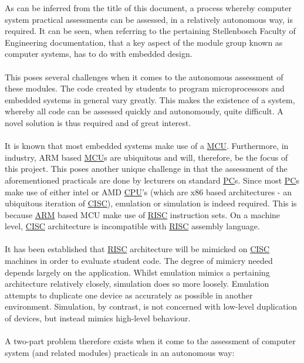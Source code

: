 As can be inferred from the title of this document, a process whereby computer system practical assessments can be assessed, in a relatively autonomous way, is required. It can be seen, when referring to the pertaining Stellenbosch Faculty of Engineering documentation, that a key aspect of the module group known as computer systems, has to do with embedded design. \cite{Stelle2020}
\\\\
This poses several challenges when it comes to the autonomous assessment of these modules. The code created by students to program microprocessors and embedded systems in general vary greatly. This makes the existence of a system, whereby all code can be assessed quickly and autonomously, quite difficult. A novel solution is thus required and of great interest.
\\\\
It is known that most embedded systems make use of a \hyperref[listAbr]{MCU}. Furthermore, in industry, ARM based \hyperref[listAbr]{MCU}s are ubiquitous and will, therefore, be the focus of this project. This poses another unique challenge in that the assessment of the aforementioned practicals are done by lecturers on standard \hyperref[listAbr]{PC}s. Since most \hyperref[listAbr]{PC}s make use of either intel\textsuperscript{{\tiny{\textregistered}}} or AMD\textsuperscript{{\tiny{\textregistered}}} \hyperref[listAbr]{CPU}'s (which are x86 based architectures - an ubiquitous iteration of \hyperref[listAbr]{CISC}), emulation or simulation is indeed required. This is because \hyperref[listAbr]{ARM} based MCU make use of \hyperref[listAbr]{RISC} instruction sets. On a machine level, \hyperref[listAbr]{CISC} architecture is incompatible with \hyperref[listAbr]{RISC} assembly language.
\\\\
It has been established that \hyperref[listAbr]{RISC} architecture will be mimicked on \hyperref[listAbr]{CISC} machines in order to evaluate student code. The degree of mimicry needed depends largely on the application. Whilst emulation mimics a pertaining architecture relatively closely, simulation does so more loosely. Emulation attempts to duplicate one device as accurately as possible in another environment. Simulation, by contrast, is not concerned with low-level duplication of devices, but instead mimics high-level behaviour.\cite{Chris}
\\\\
A two-part problem therefore exists when it come to the assessment of computer system (and related modules) practicals in an autonomous way:

